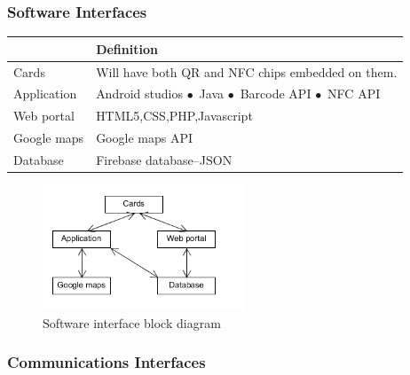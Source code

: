 \documentclass[english]{article}
\begin{document}
				   
\subsubsection{Software Interfaces}


\begin{tabular}{ |p{3cm}|p{9cm}|  }
				\hline
				\textbf{} & \textbf{Definition}\\
				\hline
				Cards & Will have both QR and NFC chips embedded on them.\\
				\hline
				Application & Android studios
$\bullet$\ Java
$\bullet$\ Barcode API
$\bullet$\ NFC API
\\
				\hline
				 Web portal & HTML5,CSS,PHP,Javascript\\
				
				\hline
				 Google maps & Google maps API\\
				\hline
				 Database & Firebase database–JSON\\
				\hline
				
				\end{tabular}
\begin{figure}[ht!]
\centering
\includegraphics[width=60mm]{Software.png}
\caption{Software interface block diagram}
\end{figure}
	
					
\subsubsection{Communications Interfaces}
\end{document}
